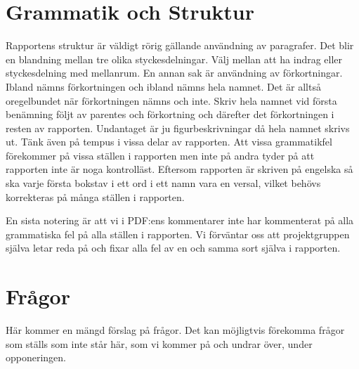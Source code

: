 \documentclass{article}
\begin{document}
\section{Grammatik och Struktur}
Rapportens struktur är väldigt rörig gällande användning av paragrafer. Det blir en blandning mellan tre olika styckesdelningar. Välj mellan att ha indrag eller styckesdelning med mellanrum. En annan sak är användning av förkortningar. Ibland nämns förkortningen och ibland nämns hela namnet. Det är alltså oregelbundet när förkortningen nämns och inte. Skriv hela namnet vid första benämning följt av parentes och förkortning och därefter det förkortningen i resten av rapporten. Undantaget är ju figurbeskrivningar då hela namnet skrivs ut. Tänk även på tempus i vissa delar av rapporten. Att vissa grammatikfel förekommer på vissa ställen i rapporten men inte på andra tyder på att rapporten inte är noga kontrolläst. Eftersom rapporten är skriven på engelska så ska varje första bokstav i ett ord i ett namn vara en versal, vilket behövs korrekteras på många ställen i rapporten. 

En sista notering är att vi i PDF:ens kommentarer inte har kommenterat på alla grammatiska fel på alla ställen i rapporten. Vi förväntar oss att projektgruppen själva letar reda på och fixar alla fel av en och samma sort själva i rapporten.

\newpage
\section{Frågor}
Här kommer en mängd förslag på frågor. Det kan möjligtvis förekomma frågor som ställs som inte står här, som vi kommer på och undrar över, under opponeringen.
\end{document}

